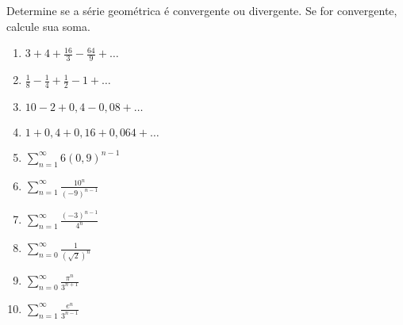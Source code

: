 \item\label{5}
Determine se a série geométrica é convergente ou divergente.
Se for convergente, calcule sua soma.

\begin{multicols}{2}
    \begin{enumerate}
        \item $3 + 4 + \frac{16}{3} - \frac{64}{9} + \dots$
        \item $\frac{1}{8} - \frac{1}{4} + \frac{1}{2} - 1 + \dots$
        \item $10 - 2 + 0,4 - 0,08 + \dots$
        \item $1 + 0,4 + 0,16 + 0,064 + \dots$
        \item $\displaystyle \sum_{n=1}^{\infty} 6(0,9)^{n-1}$
        \item $\displaystyle \sum_{n=1}^{\infty} \frac{10^n}{(-9)^{n-1}}$
        \item $\displaystyle \sum_{n=1}^{\infty} \frac{(-3)^{n-1}}{4^n}$
        \item $\displaystyle \sum_{n=0}^{\infty} \frac{1}{(\sqrt{2})^n}$
        \item $\displaystyle \sum_{n=0}^{\infty} \frac{\pi^n}{3^{n+1}}$
        \item $\displaystyle \sum_{n=1}^{\infty} \frac{e^n}{3^{n-1}}$
    \end{enumerate}
\end{multicols}